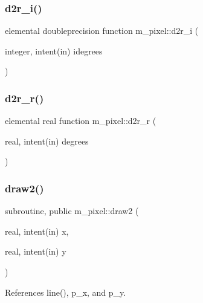 \subsubsection{\texorpdfstring{d2r\+\_\+i()}{d2r\_i()}}
{\footnotesize\ttfamily elemental doubleprecision function m\+\_\+pixel\+::d2r\+\_\+i (\begin{DoxyParamCaption}\item[{integer, intent(in)}]{idegrees }\end{DoxyParamCaption})\hspace{0.3cm}{\ttfamily [private]}}

\mbox{\label{namespacem__pixel_af1963e62c5cc06bfb042831d1c869dc1}} 
\subsubsection{\texorpdfstring{d2r\+\_\+r()}{d2r\_r()}}
{\footnotesize\ttfamily elemental real function m\+\_\+pixel\+::d2r\+\_\+r (\begin{DoxyParamCaption}\item[{real, intent(in)}]{degrees }\end{DoxyParamCaption})\hspace{0.3cm}{\ttfamily [private]}}

\mbox{\label{namespacem__pixel_a12012e819bb14b27d2b49732aa2e4e55}} 
\subsubsection{\texorpdfstring{draw2()}{draw2()}}
{\footnotesize\ttfamily subroutine, public m\+\_\+pixel\+::draw2 (\begin{DoxyParamCaption}\item[{real, intent(in)}]{x,  }\item[{real, intent(in)}]{y }\end{DoxyParamCaption})}



References line(), p\+\_\+x, and p\+\_\+y.

